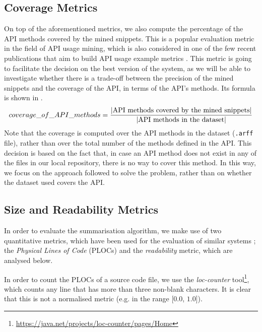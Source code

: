 \subsection{Coverage Metrics}
\label{subsec:evaluation-coverage}

On top of the aforementioned metrics, we also compute the percentage of the API methods covered by the mined snippets. This is a popular evaluation metric in the field of API usage mining, which is also considered in one of the few recent publications that aim to build API usage example metrics \cite{Radevski:2016}. This metric is going to facilitate the decision on the best version of the system, as we will be able to investigate whether there is a trade-off between the precision of the mined snippets and the coverage of the API, in terms of the API's methods. Its formula is shown in .
\vspace{1.5ex}
%
\begin{equation}
 \label{eq:coverage}
 \centering
  coverage\_of\_API\_methods =  
  \frac{ | \text{API methods covered by the mined snippets} | }
       { | \text{API methods in the dataset} | }
 \vspace{1.5ex}
\end{equation}
%
Note that the coverage is computed over the API methods in the dataset (\texttt{.arff} file), rather than over the total number of the methods defined in the API. This decision is based on the fact that, in case an API method does not exist in any of the files in our local repository, there is no way to cover this method. In this way, we focus on the approach followed to solve the problem, rather than on whether the dataset used covers the API.


\subsection{Size and Readability Metrics}
\label{subsec:evaluation-size-readability}

In order to evaluate the summarisation algorithm, we make use of two quantitative metrics, which have been used for the evaluation of similar systems \cite{Buse:2012}; the \textit{Physical Lines of Code} (PLOCs) and the \textit{readability} metric, which are analysed below.

In order to count the PLOCs of a source code file, we use the \textit{loc-counter} tool\footnote{\url{https://java.net/projects/loc-counter/pages/Home}}, which counts any line that has more than three non-blank characters. It is clear that this is not a normalised metric (e.g. in the range [$0.0$, $1.0$]).

